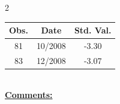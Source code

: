 
\bigskip 
\begin{multicols}{2}{ 
\begin{tabular}{ccc}
\hline  Obs.  &  Date &  Std. Val. \\ 
\hline 
                       81 &       10/2008 &         -3.30 \vspace{-.12in} \\  
                       83 &       12/2008 &         -3.07 \vspace{-.12in} \\  
 \end{tabular} 
\\ 
 \columnbreak 
 \singlespacing 
 \underline{\textbf{Comments:}} \\ 
 \bigskip       

 } 
\end{multicols} 
